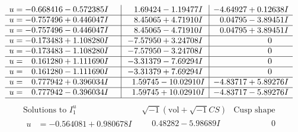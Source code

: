 \documentclass[1p]{elsarticle_modified}
\theoremstyle{definition}
\newcommand{\I}{\sqrt{-1}}
\begin{document}
$$\begin{array}{c|c|c}
\begin{aligned}
u &= -0.668416 - 0.572385 I\end{aligned}
 & \phantom{-}1.69424 - 1.19477 I & -4.64927 + 0.12638 I \\ \hline\begin{aligned}
u &= -0.757496 + 0.446047 I\end{aligned}
 & \phantom{-}8.45065 + 4.71910 I & \phantom{-}0.04795 - 3.89451 I \\ \hline\begin{aligned}
u &= -0.757496 - 0.446047 I\end{aligned}
 & \phantom{-}8.45065 - 4.71910 I & \phantom{-}0.04795 + 3.89451 I \\ \hline\begin{aligned}
u &= -0.173483 + 1.108280 I\end{aligned}
 & -7.57950 + 3.24708 I & \phantom{-0.000000 } 0 \\ \hline\begin{aligned}
u &= -0.173483 - 1.108280 I\end{aligned}
 & -7.57950 - 3.24708 I & \phantom{-0.000000 } 0 \\ \hline\begin{aligned}
u &= \phantom{-}0.161280 + 1.111690 I\end{aligned}
 & -3.31379 - 7.69294 I & \phantom{-0.000000 } 0 \\ \hline\begin{aligned}
u &= \phantom{-}0.161280 - 1.111690 I\end{aligned}
 & -3.31379 + 7.69294 I & \phantom{-0.000000 } 0 \\ \hline\begin{aligned}
u &= \phantom{-}0.777942 + 0.396034 I\end{aligned}
 & \phantom{-}1.59745 - 10.02910 I & -4.83717 + 5.89276 I \\ \hline\begin{aligned}
u &= \phantom{-}0.777942 - 0.396034 I\end{aligned}
 & \phantom{-}1.59745 + 10.02910 I & -4.83717 - 5.89276 I\\
 \hline 
 \end{array}$$\newpage$$\begin{array}{c|c|c}  
\text{Solutions to }I^u_{1}& \I (\text{vol} + \sqrt{-1}CS) & \text{Cusp shape}\\
 \hline 
\begin{aligned}
u &= -0.564081 + 0.980678 I\end{aligned}
 & \phantom{-}0.48282 - 5.98689 I & \phantom{-0.000000 } 0 \\ \hline\begin{aligned}

\end{aligned}
\end{array}$$
\end{document}
